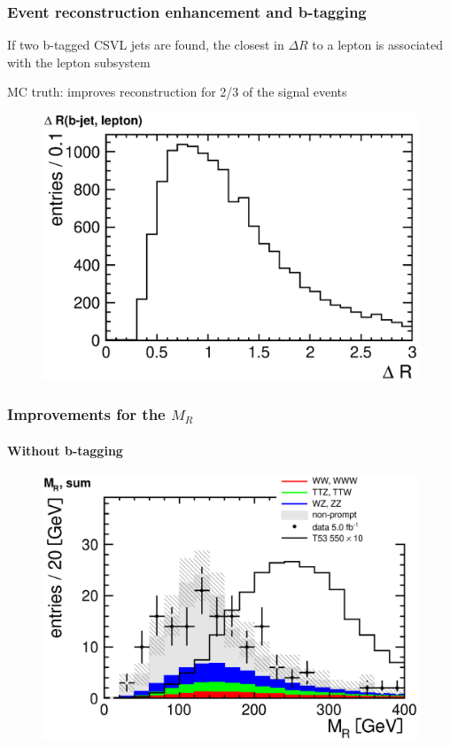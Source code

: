 \documentclass[ukenglish]{beamer}
\begin{document}
\begin{frame}
    \frametitle{Event reconstruction enhancement and b-tagging}
    \alert{If two b-tagged CSVL jets are found, the closest in $\Delta R$ to
    a lepton is associated with the lepton subsystem}

    \alert{MC truth: improves reconstruction for 2/3 of the signal events}
    \begin{figure}[h]
        \centering
        \includegraphics[height=.5\textheight]{signal_mc_dr_jet_lepton.eps}
    \end{figure}
\end{frame}

\begin{frame}
    \frametitle{Improvements for the $M_R$}
    \framesubtitle{Without b-tagging}
        \begin{figure}[h!]
            \centering
                \includegraphics[height=.8\textheight]{mr_sum.eps}
        \end{figure}
\end{frame}
\end{document}
